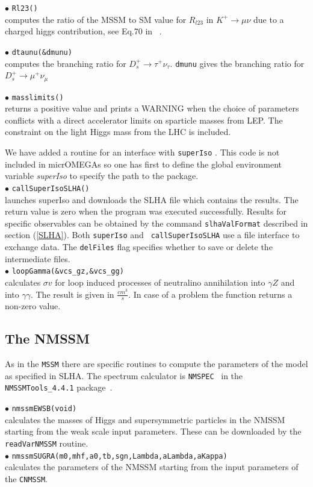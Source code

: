 \documentclass[12pt,a4paper]{article}
\begin{document}
\noi$\bullet$ \verb|Rl23()|\\
computes the ratio of the MSSM to SM value for $R_{l23}$ in $K^+\rightarrow \mu\nu$  due to a  charged higgs contribution, see Eq.70 in ~\cite{Belanger:2013oya}. 

\noi$\bullet$ \verb|dtaunu(&dmunu)|\\
computes the branching ratio  for ${D}_s^+\rightarrow\tau^+\nu_\tau$. \verb|dmunu| 
gives  the branching ratio  for ${D}_s^+\rightarrow\mu^+\nu_\mu$

 
\noi$\bullet$ \verb|masslimits()|\\
returns a positive value  and
 prints a WARNING when the choice of parameters conflicts with a
direct accelerator limits on sparticle masses from LEP.
The constraint on the light Higgs mass from the LHC is included.  

We have added a routine for an interface with {\tt superIso}
\cite{Arbey:2011zz}. This code is not 
included in micrOMEGAs so one has first to define 
the global environment  variable {\it superIso} 
to specify the path to the package.\\ 
\noi$\bullet$ \verb|callSuperIsoSLHA()|\\
launches superIso and downloads the SLHA file which  contains the results. The
return value is zero when the program was  executed successfully.  Results
for specific  observables can be obtained by the command {\tt slhaValFormat}
described in  section (\ref{SLHA}).  Both {\tt superIso} and {\tt
callSuperIsoSLHA} use a file interface to exchange data. The {\tt delFiles} flag specifies whether
to save or delete the intermediate files.\\
\noi$\bullet$ \verb|loopGamma(&vcs_gz,&vcs_gg)|\\
calculates $\sigma v$ for  loop induced processes of neutralino
annihilation into $\gamma Z$ and into $\gamma \gamma$. The result is given in  
$\frac{cm^3}{s}$. In case of a problem the function returns a non-zero value. 

\subsection{The NMSSM}

As in the {\tt MSSM} there are specific routines to compute the  
parameters of the model as  specified in SLHA. The spectrum calculator is \verb|NMSPEC|~\cite{Ellwanger:2006rn}
 in the \verb|NMSSMTools_4.4.1| package~\cite{nmssmtools}.

\noindent$\bullet$ \verb|nmssmEWSB(void)|\\
calculates the masses of Higgs and supersymmetric particles in the NMSSM
starting from the weak scale input parameters. These  can be downloaded by the 
{\tt readVarNMSSM} routine.~\cite{Ellwanger:2005dv}\\   
\noindent$\bullet$ \verb|nmssmSUGRA(m0,mhf,a0,tb,sgn,Lambda,aLambda,aKappa)|\\
calculates the parameters of the NMSSM starting from the input parameters of 
the \verb|CNMSSM|.
\end{document}
